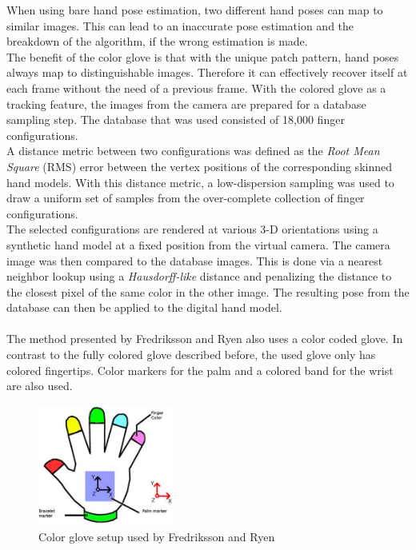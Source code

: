 When using bare hand pose estimation, two different hand poses can map to similar images. This can lead to an inaccurate pose estimation and the breakdown of the algorithm, if the wrong estimation is made.\\
The benefit of the color glove is that with the unique patch pattern, hand poses always map to distinguishable images. Therefore it can effectively recover itself at each frame without the need of a previous frame.
With the colored glove as a tracking feature, the images from the camera are prepared for a database sampling step. The database that was used consisted of 18,000 finger configurations. 
\\A distance metric between two configurations was defined as the \textit{Root Mean Square} (RMS) error between the vertex positions of the corresponding skinned hand models. With this distance metric, a low-dispersion sampling was used to draw a uniform set of samples from the over-complete collection of finger configurations.
\\The selected configurations are rendered at various 3-D orientations using a synthetic hand model at a fixed position from the virtual camera.
The camera image was then compared to the database images. This is done via a nearest neighbor lookup using a \textit{Hausdorff-like} distance \cite{Huttenlocher.1993} and penalizing the distance to the closest pixel of the same color in the other image. The resulting pose from the database can then be applied to the digital hand model.\\\\
The method presented by Fredriksson and Ryen \cite{Fredriksson.2008} also uses a color coded glove. In contrast to the fully colored glove described before, the used glove only has colored fingertips. Color markers for the palm and a colored band for the wrist are also used.
\begin{figure}
\includegraphics[width=0.4\textwidth]{images/fredrikkson_color_glove.JPG}
\caption{Color glove setup used by Fredriksson and Ryen  \cite{Fredriksson.2008} }
\label{Fredriksson color glove}
\end{figure}
